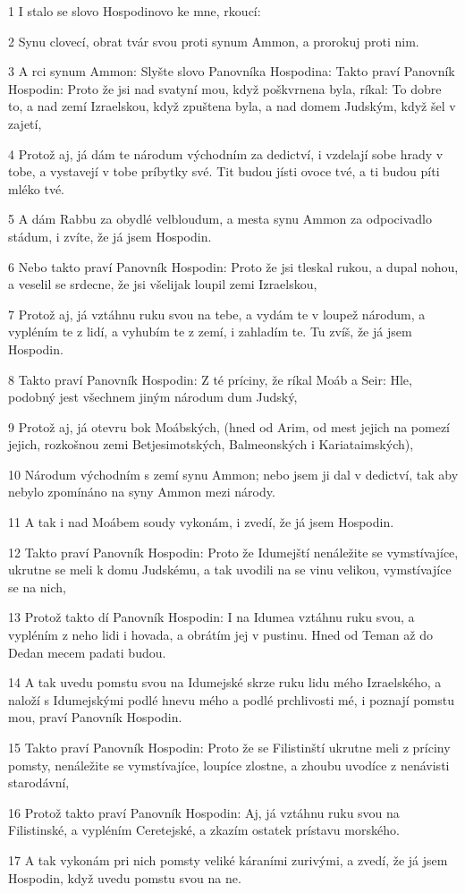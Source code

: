 \par 1 I stalo se slovo Hospodinovo ke mne, rkoucí:
\par 2 Synu clovecí, obrat tvár svou proti synum Ammon, a prorokuj proti nim.
\par 3 A rci synum Ammon: Slyšte slovo Panovníka Hospodina: Takto praví Panovník Hospodin: Proto že jsi nad svatyní mou, když poškvrnena byla, ríkal: To dobre to, a nad zemí Izraelskou, když zpuštena byla, a nad domem Judským, když šel v zajetí,
\par 4 Protož aj, já dám te národum východním za dedictví, i vzdelají sobe hrady v tobe, a vystavejí v tobe príbytky své. Tit budou jísti ovoce tvé, a ti budou píti mléko tvé.
\par 5 A dám Rabbu za obydlé velbloudum, a mesta synu Ammon za odpocivadlo stádum, i zvíte, že já jsem Hospodin.
\par 6 Nebo takto praví Panovník Hospodin: Proto že jsi tleskal rukou, a dupal nohou, a veselil se srdecne, že jsi všelijak loupil zemi Izraelskou,
\par 7 Protož aj, já vztáhnu ruku svou na tebe, a vydám te v loupež národum, a vypléním te z lidí, a vyhubím te z zemí, i zahladím te. Tu zvíš, že já jsem Hospodin.
\par 8 Takto praví Panovník Hospodin: Z té príciny, že ríkal Moáb a Seir: Hle, podobný jest všechnem jiným národum dum Judský,
\par 9 Protož aj, já otevru bok Moábských, (hned od Arim, od mest jejich na pomezí jejich, rozkošnou zemi Betjesimotských, Balmeonských i Kariataimských),
\par 10 Národum východním s zemí synu Ammon; nebo jsem ji dal v dedictví, tak aby nebylo zpomínáno na syny Ammon mezi národy.
\par 11 A tak i nad Moábem soudy vykonám, i zvedí, že já jsem Hospodin.
\par 12 Takto praví Panovník Hospodin: Proto že Idumejští nenáležite se vymstívajíce, ukrutne se meli k domu Judskému, a tak uvodili na se vinu velikou, vymstívajíce se na nich,
\par 13 Protož takto dí Panovník Hospodin: I na Idumea vztáhnu ruku svou, a vypléním z neho lidi i hovada, a obrátím jej v pustinu. Hned od Teman až do Dedan mecem padati budou.
\par 14 A tak uvedu pomstu svou na Idumejské skrze ruku lidu mého Izraelského, a naloží s Idumejskými podlé hnevu mého a podlé prchlivosti mé, i poznají pomstu mou, praví Panovník Hospodin.
\par 15 Takto praví Panovník Hospodin: Proto že se Filistinští ukrutne meli z príciny pomsty, nenáležite se vymstívajíce, loupíce zlostne, a zhoubu uvodíce z nenávisti starodávní,
\par 16 Protož takto praví Panovník Hospodin: Aj, já vztáhnu ruku svou na Filistinské, a vypléním Ceretejské, a zkazím ostatek prístavu morského.
\par 17 A tak vykonám pri nich pomsty veliké káraními zurivými, a zvedí, že já jsem Hospodin, když uvedu pomstu svou na ne.

